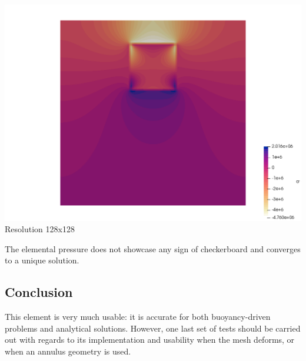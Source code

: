 \begin{center}
\includegraphics[width=7.cm]{python_codes/fieldstone_80/results/block/q}\\
{\captionfont Resolution 128x128}
\end{center}
The elemental pressure does not showcase any sign of checkerboard and converges to a unique solution. 


\subsection*{Conclusion}

This element is very much usable: it is accurate for both buoyancy-driven problems and 
analytical solutions. 
However, one last set of tests should be carried out with regards to its implementation 
and usability when the mesh deforms, or when an annulus geometry is used.
